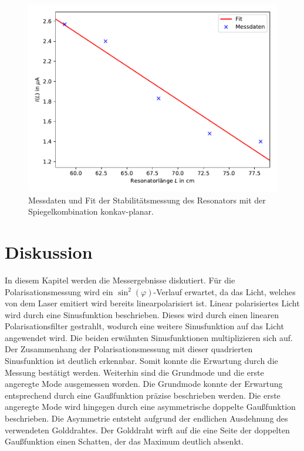 \begin{figure}[h]
  \centering
  \includegraphics[width = \textwidth]{Pics/Stabilitaet_kp.pdf}
  \caption{Messdaten und Fit der Stabilitätsmessung des Resonators mit der Spiegelkombination konkav-planar.}
  \label{fig:stabilität_lin}
\end{figure}

\section{Diskussion}

In diesem Kapitel werden die Messergebnisse diskutiert.
Für die Polarisationsmessung wird ein $\sin^2(\varphi)$-Verlauf erwartet, da
das Licht, welches von dem Laser emitiert wird bereits linearpolarisiert ist.
Linear polarisiertes Licht wird durch eine Sinusfunktion beschrieben. Dieses wird
durch einen linearen Polarisationsfilter gestrahlt, wodurch eine weitere
Sinusfunktion auf das Licht angewendet wird. Die beiden erwähnten Sinusfunktionen
multiplizieren sich auf.
Der Zusammenhang der Polarisationsmessung mit dieser
quadrierten Sinusfunktion ist deutlich erkennbar. Somit konnte die Erwartung durch
die Messung bestätigt werden.
Weiterhin sind die Grundmode und die erste angeregte Mode ausgemessen worden.
Die Grundmode konnte der Erwartung entsprechend durch eine Gaußfunktion präzise beschrieben werden.
Die erste angeregte Mode wird hingegen durch eine asymmetrische doppelte Gaußfunktion
beschrieben. Die Asymmetrie entsteht aufgrund der endlichen Ausdehnung des verwendeten
Golddrahtes. Der Golddraht wirft auf die eine Seite der doppelten Gaußfunktion einen
Schatten, der das Maximum deutlich absenkt.

